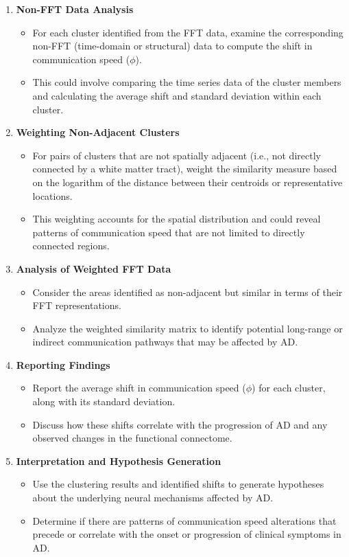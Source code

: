 \documentclass[twocolumn]{article}
\begin{document}
\begin{enumerate}
\begin{itemize}
\end{itemize}
\item \textbf{Non-FFT Data Analysis}
\begin{itemize}
\item For each cluster identified from the FFT data, examine the corresponding non-FFT (time-domain or structural) data to compute the shift in communication speed (\(\phi\)).
\item This could involve comparing the time series data of the cluster members and calculating the average shift and standard deviation within each cluster.
\end{itemize}
\item \textbf{Weighting Non-Adjacent Clusters}
\begin{itemize}
\item For pairs of clusters that are not spatially adjacent (i.e., not directly connected by a white matter tract), weight the similarity measure based on the logarithm of the distance between their centroids or representative locations.
\item This weighting accounts for the spatial distribution and could reveal patterns of communication speed that are not limited to directly connected regions.
\end{itemize}
\item \textbf{Analysis of Weighted FFT Data}
\begin{itemize}
\item Consider the areas identified as non-adjacent but similar in terms of their FFT representations.
\item Analyze the weighted similarity matrix to identify potential long-range or indirect communication pathways that may be affected by AD.
\end{itemize}
\item \textbf{Reporting Findings}
\begin{itemize}
\item Report the average shift in communication speed (\(\phi\)) for each cluster, along with its standard deviation.
\item Discuss how these shifts correlate with the progression of AD and any observed changes in the functional connectome.
\end{itemize}
\item \textbf{Interpretation and Hypothesis Generation}
\begin{itemize}
\item Use the clustering results and identified shifts to generate hypotheses about the underlying neural mechanisms affected by AD.
\item Determine if there are patterns of communication speed alterations that precede or correlate with the onset or progression of clinical symptoms in AD.
\end{itemize}
\end{enumerate}
\end{document}
